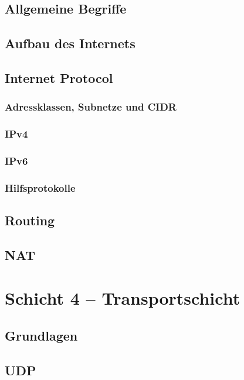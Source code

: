 \documentclass[a4paper,10pt]{scrartcl}
\begin{document}
\subsection{Allgemeine Begriffe}
\subsection{Aufbau des Internets}
\subsection{Internet Protocol}
\subsubsection{Adressklassen, Subnetze und CIDR}
\subsubsection{IPv4}
\subsubsection{IPv6}
\subsubsection{Hilfsprotokolle}
\subsection{Routing}
\subsection{NAT}

\section{Schicht 4 -- Transportschicht}
\subsection{Grundlagen}
\subsection{UDP}
\end{document}
